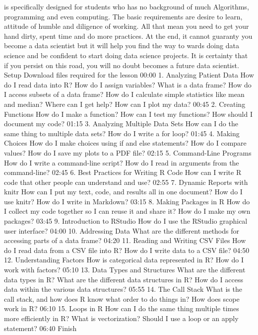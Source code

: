 \documentclass[
]{book}
\begin{document}
is specifically designed for students who has no background of much Algorithms, programming and even computing. The basic requirements are desire to learn, attitude of humble and diligence of working. All that mean you need to get your hand dirty, spent time and do more practices. At the end, it cannot guaranty you become a data scientist but it will help you find the way to wards doing data science and be confident to start doing data science projects. It is certainty that if you persist on this road, you will no doubt becomes a future data scientist.
Setup Download files required for the lesson
00:00 1. Analyzing Patient Data How do I read data into R?
How do I assign variables?
What is a data frame?
How do I access subsets of a data frame?
How do I calculate simple statistics like mean and median?
Where can I get help?
How can I plot my data?
00:45 2. Creating Functions How do I make a function?
How can I test my functions?
How should I document my code?
01:15 3. Analyzing Multiple Data Sets How can I do the same thing to multiple data sets?
How do I write a for loop?
01:45 4. Making Choices How do I make choices using if and else statements?
How do I compare values?
How do I save my plots to a PDF file?
02:15 5. Command-Line Programs How do I write a command-line script?
How do I read in arguments from the command-line?
02:45 6. Best Practices for Writing R Code How can I write R code that other people can understand and use?
02:55 7. Dynamic Reports with knitr How can I put my text, code, and results all in one document?
How do I use knitr?
How do I write in Markdown?
03:15 8. Making Packages in R How do I collect my code together so I can reuse it and share it?
How do I make my own packages?
03:45 9. Introduction to RStudio How do I use the RStudio graphical user interface?
04:00 10. Addressing Data What are the different methods for accessing parts of a data frame?
04:20 11. Reading and Writing CSV Files How do I read data from a CSV file into R?
How do I write data to a CSV file?
04:50 12. Understanding Factors How is categorical data represented in R?
How do I work with factors?
05:10 13. Data Types and Structures What are the different data types in R?
What are the different data structures in R?
How do I access data within the various data structures?
05:55 14. The Call Stack What is the call stack, and how does R know what order to do things in?
How does scope work in R?
06:10 15. Loops in R How can I do the same thing multiple times more efficiently in R?
What is vectorization?
Should I use a loop or an apply statement?
06:40 Finish
\end{document}
